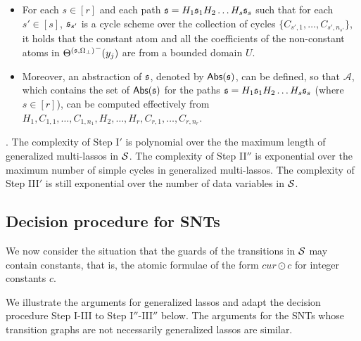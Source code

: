 \begin{itemize}
\item For each $s \in [r]$ and each path ${\mathfrak{s} }=H_1 {\mathfrak{s} }_1 H_2 \dots H_s {\mathfrak{s} }_s$ such that for each $s'\in [s]$, ${\mathfrak{s} }_{s'}$ is a cycle scheme over the collection of cycles $\{C_{s',1},\dots,C_{s',n_{s'}}\}$, it holds that the constant atom and all the coefficients of the non-constant atoms in ${\Theta^{({\mathfrak{s} },\Omega_\bot)}}^-(y_j)$ are from a bounded domain $U$.
%
\item Moreover,  an abstraction of ${\mathfrak{s} }$, denoted by $\mathsf{Abs}({\mathfrak{s} })$, can be defined, so that $\mathscr{A}$, which contains the set of $\mathsf{Abs}({\mathfrak{s} })$ for the paths ${\mathfrak{s} }=H_1 {\mathfrak{s} }_1 H_2 \dots H_s {\mathfrak{s} }_s$ (where $s \in [r]$), can be computed effectively from 
$H_1, C_{1,1}, \dots, C_{1,n_1},H_2,\dots, H_r,C_{r,1},\dots, C_{r,n_r}$.
\end{itemize}
\bigskip

. The complexity of Step I$'$ is polynomial over the the maximum length of generalized multi-lassos in ${\mathcal{S} }$. The complexity of Step II$''$ is exponential over the maximum number of simple cycles in generalized multi-lassos. The complexity of Step III$'$ is still exponential over the number of data variables in ${\mathcal{S} }$.

\subsection{Decision procedure for SNTs}\label{sec-constant}

We now consider the situation that the guards of the transitions in ${\mathcal{S} }$ may contain constants, that is, the atomic formulae of the form $cur \odot c$ for integer constants $c$. 

We illustrate the arguments for generalized lassos and adapt the decision procedure Step I-III to Step I$''$-III$''$ below. The arguments for the SNTs whose transition graphs are not necessarily generalized lassos are similar.

